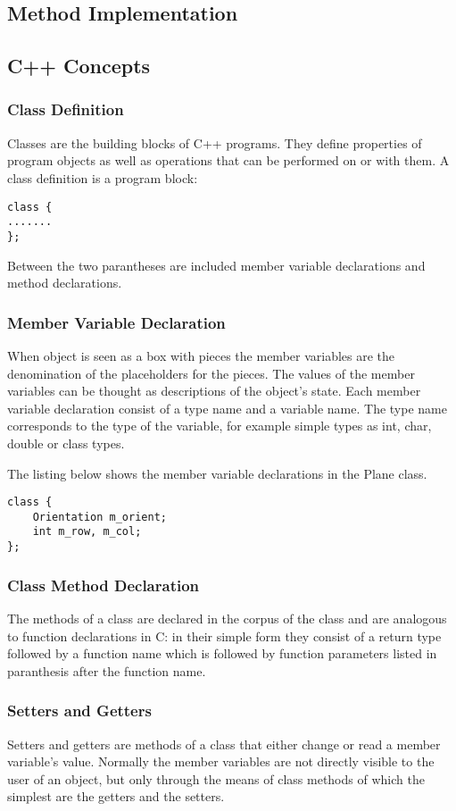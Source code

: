 \documentclass{article}
\begin{document}
\subsection {Method Implementation}


\subsection {C++ Concepts}

\subsubsection {Class Definition}
Classes are the building blocks of C++ programs. They define properties of program objects as well as operations that can be performed on or with them. A class definition is a program block:
\begin{lstlisting}
class {
.......
};
\end{lstlisting}
Between the two parantheses  are included member variable declarations and method declarations. 

\subsubsection {Member Variable Declaration}
When object is seen as a box with pieces the member variables are the denomination of the placeholders for the pieces. The values of the member variables can be thought as descriptions of the object's state. Each member variable declaration consist of a type name and a variable name. The type name corresponds to the type of the variable, for example simple types as int, char, double or class types.

The listing below shows the member variable declarations in the Plane class.
\begin{lstlisting}
class {
    Orientation m_orient;
    int m_row, m_col;
};
\end{lstlisting}

\subsubsection {Class Method Declaration}
The methods of a class are declared in the corpus of the class and are analogous to function declarations in C: in their simple form they consist of a return type followed by a function name which is followed by function parameters listed in paranthesis after the function name.

\subsubsection {Setters and Getters}
Setters and getters are methods of a class that either change or read a member variable's value. Normally the member variables are not directly visible to the user of an object, but only through the means of class methods of which the simplest are the getters and the setters.
\end{document}
